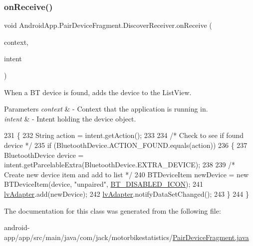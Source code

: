 \subsubsection{\texorpdfstring{on\+Receive()}{onReceive()}}
{\footnotesize\ttfamily void Android\+App.\+Pair\+Device\+Fragment.\+Discover\+Receiver.\+on\+Receive (\begin{DoxyParamCaption}\item[{Context}]{context,  }\item[{Intent}]{intent }\end{DoxyParamCaption})\hspace{0.3cm}{\ttfamily [inline]}}



When a BT device is found, adds the device to the List\+View. 


\begin{DoxyParams}{Parameters}
{\em context} & -\/ Context that the application is running in. \\
\hline
{\em intent} & -\/ Intent holding the device object. \\
\hline
\end{DoxyParams}

\begin{DoxyCode}
231                                                               \{
232             String action = intent.getAction();
233 
234             \textcolor{comment}{/* Check to see if found device */}
235             \textcolor{keywordflow}{if} (BluetoothDevice.ACTION\_FOUND.equals(action))
236             \{
237                 BluetoothDevice device = intent.getParcelableExtra(BluetoothDevice.EXTRA\_DEVICE);
238 
239                 \textcolor{comment}{/* Create new device item and add to list */}
240                 BTDeviceItem newDevice = \textcolor{keyword}{new} BTDeviceItem(device, \textcolor{stringliteral}{"unpaired"}, 
      \hyperlink{class_android_app_1_1_pair_device_fragment_a68e4843e20a0d81574ba3d9e78a67be5}{BT\_DISABLED\_ICON});
241                 \hyperlink{class_android_app_1_1_pair_device_fragment_a27eee15fc9f4328366bba7e795e026ac}{lvAdapter}.add(newDevice);
242                 \hyperlink{class_android_app_1_1_pair_device_fragment_a27eee15fc9f4328366bba7e795e026ac}{lvAdapter}.notifyDataSetChanged();
243             \}
244         \}
\end{DoxyCode}


The documentation for this class was generated from the following file\+:\begin{DoxyCompactItemize}
\item 
android-\/app/app/src/main/java/com/jack/motorbikestatistics/\hyperlink{_pair_device_fragment_8java}{Pair\+Device\+Fragment.\+java}\end{DoxyCompactItemize}
